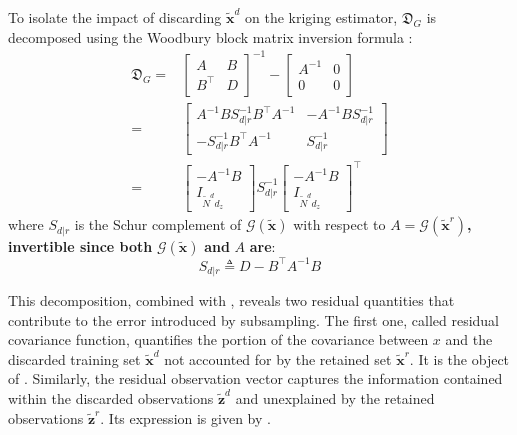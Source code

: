\documentclass[preprint]{elsarticle}
\begin{document}
To isolate the impact of discarding $\tilde{\mathbf{x}}^d$ on the kriging estimator, $\mathfrak{D}_G$ is decomposed using the Woodbury block matrix inversion formula \cite{bib:matrix-cookbook}:
\begin{equation}
    \begin{aligned}
    \mathfrak{D}_G=&\begin{bmatrix}A&B\\B^\top&D\end{bmatrix}^{-1}-\begin{bmatrix}A^{-1}&0\\0&0\end{bmatrix}\\
    =&\begin{bmatrix}A^{-1}BS_{d|r}^{-1}B^\top A^{-1}&-A^{-1}BS_{d|r}^{-1}\\-S_{d|r}^{-1}B^\top A^{-1}&S_{d|r}^{-1}\end{bmatrix}\\
    =&\begin{bmatrix}-A^{-1}B\\I_{\tilde{N}^dd_z}\end{bmatrix}S_{d|r}^{-1}\begin{bmatrix}-A^{-1}B\\I_{\tilde{N}^dd_z}\end{bmatrix}^\top
    \end{aligned}\label{eq:decomposed_gram_inverse_difference}
\end{equation}
where $S_{d|r}$ is the Schur complement of $\mathcal{G}(\tilde{\mathbf{x}})$ with respect to $A=\mathcal{G}(\tilde{\mathbf{x}}^r)$\textbf{, invertible since both} $\mathcal{G}(\tilde{\mathbf{x}})$ \textbf{and} $A$ \textbf{are}:
\begin{equation}
    S_{d|r}\triangleq D-B^\top A^{-1}B
\end{equation}

This decomposition, combined with , reveals two residual quantities that contribute to the error introduced by subsampling. The first one, called residual covariance function, quantifies the portion of the covariance between $x$ and the discarded training set $\tilde{\mathbf{x}}^d$ not accounted for by the retained set $\tilde{\mathbf{x}}^r$. It is the object of . Similarly, the residual observation vector captures the information contained within the discarded observations $\tilde{\mathbf{z}}^d$ and unexplained by the retained observations $\tilde{\mathbf{z}}^r$. Its expression is given by .
\end{document}
